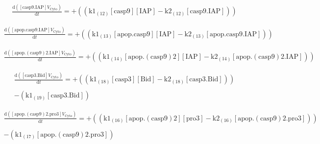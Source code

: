 \documentclass[a4paper,12pt]{article} %
\newcommand{\M}[1]{\mathrm{#1}}
\begin{document}
\begin{equation}
\begin{split}
\frac {\M{d}( {{\M{[casp9.IAP]}}    {V}_{\M{Cyto}} } ) }  {\M{d}{t} }  =  {  +  (( {{\M{k1}}_{\M{(12)}}    {\M{[casp9]}}    {\M{[IAP]}}  -  {\M{k2}}_{\M{(12)}}    {\M{[casp9.IAP]}} } )) }
\end{split}
\end{equation}

\begin{equation}
\begin{split}
\frac {\M{d}( {{\M{[apop.casp9.IAP]}}    {V}_{\M{Cyto}} } ) }  {\M{d}{t} }  =  {  +  (( {{\M{k1}}_{\M{(13)}}    {\M{[apop.casp9]}}    {\M{[IAP]}}  -  {\M{k2}}_{\M{(13)}}    {\M{[apop.casp9.IAP]}} } )) }
\end{split}
\end{equation}

\begin{equation}
\begin{split}
\frac {\M{d}( {{\M{[apop.(casp9)2.IAP]}}    {V}_{\M{Cyto}} } ) }  {\M{d}{t} }  =  {  +  (( {{\M{k1}}_{\M{(14)}}    {\M{[apop.(casp9)2]}}    {\M{[IAP]}}  -  {\M{k2}}_{\M{(14)}}    {\M{[apop.(casp9)2.IAP]}} } )) }
\end{split}
\end{equation}



\begin{equation}
\begin{split}
\frac {\M{d}( {{\M{[casp3.Bid]}}    {V}_{\M{Cyto}} } ) }  {\M{d}{t} }  =  {  +  (( {{\M{k1}}_{\M{(18)}}    {\M{[casp3]}}    {\M{[Bid]}}  -  {\M{k2}}_{\M{(18)}}    {\M{[casp3.Bid]}} } )) } \\ 
  \\ 
   {  -  ( {{\M{k1}}_{\M{(19)}}    {\M{[casp3.Bid]}} } ) }
\end{split}
\end{equation}

\begin{equation}
\begin{split}
\frac {\M{d}( {{\M{[apop.(casp9)2.pro3]}}    {V}_{\M{Cyto}} } ) }  {\M{d}{t} }  =  {  +  (( {{\M{k1}}_{\M{(16)}}    {\M{[apop.(casp9)2]}}    {\M{[pro3]}}  -  {\M{k2}}_{\M{(16)}}    {\M{[apop.(casp9)2.pro3]}} } )) } \\ 
  \\ 
   {  -  ( {{\M{k1}}_{\M{(17)}}    {\M{[apop.(casp9)2.pro3]}} } ) }
\end{split}
\end{equation}
\end{document}
